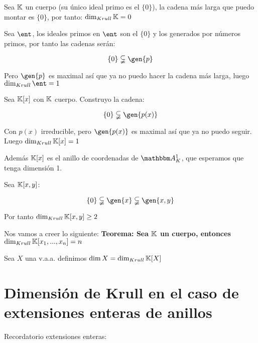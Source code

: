 \begin{example}
	Sea $\mathbb{K}$ un cuerpo (su único ideal primo es el $\{0\}$), la cadena más larga que puedo montar es $\{0\}$, por tanto: $\dim_{Krull} \mathbb{K} = 0$
\end{example}

\begin{example}
	Sea $\ent$, los ideales primos en $\ent$ son el $\{0\}$ y los generados por números primos, por tanto las cadenas serán:
	
	$$ \{0\} \subsetneqq \gen{p} $$
	
	Pero $\gen{p}$ es maximal así que ya no puedo hacer la cadena más larga, luego $\dim_{Krull} \ent = 1$
\end{example}

\begin{example}
	Sea $\mathbb{K}[x]$ con $\mathbb{K}$ cuerpo. Construyo la cadena:
	
	$$\{0\} \subsetneqq  \gen{p(x)} $$
	
	Con $p(x)$ irreducible, pero $\gen{p(x)}$ es maximal así que ya no puedo seguir. Luego  $\dim_{Krull} \mathbb{K}[x] = 1$
	
	Además $\mathbb{K}[x]$ es el anillo de coordenadas de $\A^1_K$, que esperamos que tenga dimensión 1.
\end{example}

\begin{example}
	Sea $\mathbb{K}[x,y]$:
	
	$$\{0\} \subsetneqq  \gen{x} \subsetneqq \gen{x,y} $$
	
	Por tanto  $\dim_{Krull} \mathbb{K}[x,y] \geq 2$
\end{example}

	Nos vamos a creer lo siguiente: \textbf{Teorema: Sea $\mathbb{K}$ un cuerpo, entonces $\dim_{Krull} \mathbb{K}[x_1,...,x_n]=n$}
	
	\begin{defn}
		Sea $X$ una v.a.a. definimos $\dim X = \dim_{Krull} \mathbb{K}[X]$
	\end{defn}
	
\section{Dimensión de Krull en el caso de extensiones enteras de anillos}

Recordatorio extensiones enteras:

